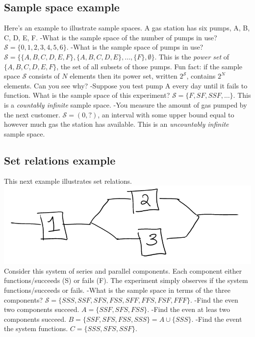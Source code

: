 \documentclass[]{book}
\begin{document}
\subsection{Sample space example}\label{sample-space-example}

Here's an example to illustrate sample spaces. A gas station has six
pumps, A, B, C, D, E, F. -What is the sample space of the number of
pumps in use? \(\mathcal{S} =\{0,1,2,3,4,5,6\}\). -What is the sample
space of pumps in use?
\(\mathcal{S} = \{\{A,B,C,D,E,F\},\{A,B,C,D,E\}, \ldots,\{F\}, \emptyset \}\).
This is the \emph{power set} of \(\{A,B,C,D,E,F\}\), the set of all
subsets of those pumps. Fun fact: if the sample space \(\mathcal{S}\)
consists of \(N\) elements then its power set, written
\(2^{\mathcal{S}}\), contains \(2^N\) elements. Can you see why?
-Suppose you test pump A every day until it fails to function. What is
the sample space of this experiment?
\(\mathcal{S} = \{F, SF, SSF, \ldots \}\). This is a \emph{countably
infinite} sample space. -You measure the amount of gas pumped by the
next customer. \(\mathcal{S} = (0, ?)\), an interval with some upper
bound equal to however much gas the station has available. This is an
\emph{uncountably infinite} sample space.

\subsection{Set relations example}\label{set-relations-example}

This next example illustrates set relations.\\
\includegraphics{system.PNG} Consider this system of series and parallel
components. Each component either functions/succeeds (S) or fails (F).
The experiment simply observes if the system functions/succeeds or
fails. -What is the sample space in terms of the three components?
\(\mathcal{S} = \{SSS, SSF, SFS, FSS, SFF, FFS, FSF, FFF\}\). -Find the
even two components succeed. \(A = \{SSF, SFS, FSS\}\). -Find the even
at leas two components succeed.
\(B = \{SSF, SFS, FSS, SSS\} = A\cup \{SSS\}\). -Find the event the
system functions. \(C = \{SSS, SFS, SSF\}\).
\end{document}
